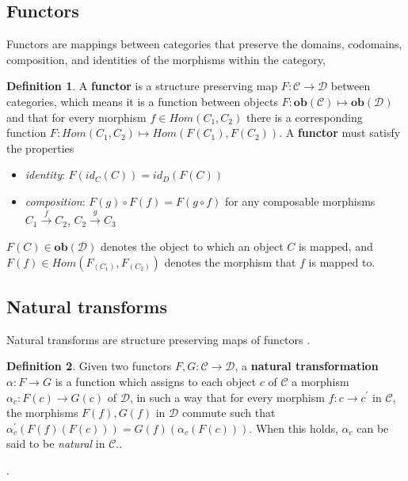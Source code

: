 \documentclass{vgtc}
\theoremstyle{definition}
\newtheorem{definition}{Definition}[section]
\theoremstyle{remark}
\begin{document}
\subsection{Functors}
\label{sec:functors}
Functors are mappings between categories that preserve the domains, codomains, composition, and identities of the morphisms within the category\cite{riehlCategoryTheoryContext2016}, 

\begin{definition}\cite{bradleyWhatFunctorDefinitions,bradleyTopologyCategoricalApproach2020} A \textbf{functor} is a structure preserving map $F: \mathcal{C} \rightarrow \mathcal{D}$ between categories, which means it is a function between objects $F: \textbf{ob}(\mathcal{C}) \mapsto \textbf{ob}(\mathcal{D})$ and that for every morphism $f \in Hom(C_1, C_2)$  there is a corresponding function $F: Hom(C_1, C_2) \mapsto Hom(F(C_1), F( C_2))$.
A \textbf{functor} must satisfy the properties
\begin{itemize}
  \item \textit{identity}: $F(id_{C}(C)) = id_{D}(F(C))$
  \item \textit{composition}: $F(g)\circ F(f) = F(g\circ f)$ for any composable morphisms $C_{1}\xrightarrow{f} C_2$, $C_2 \xrightarrow{g} C_3$
\end{itemize}
$F(C) \in \textbf{ob}(\mathcal{D})$ denotes the object to which an object $C$ is mapped, and $F(f) \in Hom(F_{(C_1)}, F_{(C_2)})$ denotes the morphism that $f$ is mapped to.
\end{definition}

\subsection{Natural transforms}
\label{sec:natural-transform}
Natural transforms are structure preserving maps of functors \cite{milewskiCategoryTheoryProgrammers2019}.

\begin{definition}\label{def:natural-transform}
  Given two functors $F, G \colon \mathcal{C}\rightarrow \mathcal{D}$, a \textbf{natural transformation} $\alpha: F \rightarrow G$ is a function which assigns to each object $c$ of $\mathcal{C}$ a morphism $\alpha_c:F(c) \rightarrow G(c)$ of $\mathcal{D}$, in such a way that for every morphism $f:c \rightarrow c^\prime$ in $\mathcal{C}$, the morphisms $F(f), G(f)$ in $\mathcal{D}$ commute such that $\alpha_c^{\prime}(F(f)(F(c))) = G(f)(\alpha_c(F(c)))$. When this holds, $\alpha_{c}$ can be said to be \textit{natural} in $\mathcal{C}$.\cite{maclaneCategoriesWorkingMathematician2013}.
\end{definition}.
\end{document}
